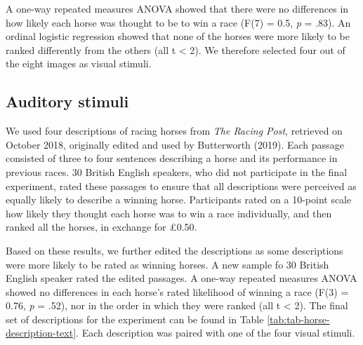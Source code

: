 \documentclass[
  man,floatsintext]{apa7}
\begin{document}
A one-way repeated measures ANOVA showed that there were no differences in how likely each horse was thought to be to win a race (F(7) = 0.5, \emph{p} = .83). An ordinal logistic regression showed that none of the horses were more likely to be ranked differently from the others (all \textbar t\textbar{} \textless{} 2). We therefore selected four out of the eight images as visual stimuli.

\hypertarget{auditory-stimuli}{%
\subsection{Auditory stimuli}\label{auditory-stimuli}}

We used four descriptions of racing horses from \emph{The Racing Post}, retrieved on October 2018, originally edited and used by Butterworth (2019). Each passage consisted of three to four sentences describing a horse and its performance in previous races. 30 British English speakers, who did not participate in the final experiment, rated these passages to ensure that all descriptions were perceived as equally likely to describe a winning horse. Participants rated on a 10-point scale how likely they thought each horse was to win a race individually, and then ranked all the horses, in exchange for £0.50.

Based on these results, we further edited the descriptions as some descriptions were more likely to be rated as winning horses. A new sample fo 30 British English speaker rated the edited passages. A one-way repeated measures ANOVA showed no differences in each horse's rated likelihood of winning a race (F(3) = 0.76, \emph{p} = .52), nor in the order in which they were ranked (all \textbar t\textbar{} \textless{} 2). The final set of descriptions for the experiment can be found in Table \ref{tab:tab-horse-description-text}. Each description was paired with one of the four visual stimuli.
\end{document}
